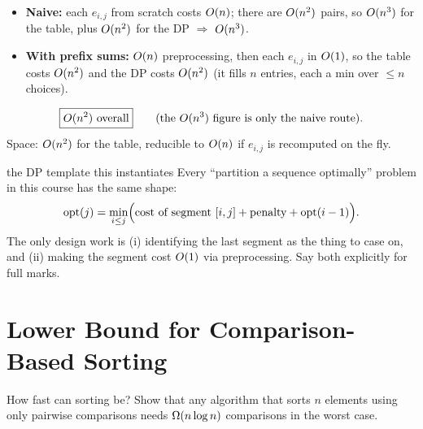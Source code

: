 \begin{cplx}
\begin{itemize}
  \item \textbf{Naive:} each $e_{i,j}$ from scratch costs $O(n)$; there are $O(n^2)$ pairs, so
        $O(n^3)$ for the table, plus $O(n^2)$ for the DP $\Rightarrow$ $O(n^3)$.
  \item \textbf{With prefix sums:} $O(n)$ preprocessing, then each $e_{i,j}$ in $O(1)$, so the
        table costs $O(n^2)$ and the DP costs $O(n^2)$ (it fills $n$ entries, each a min over
        $\le n$ choices).
\end{itemize}
\[
  \boxed{\Oh{n^2}\ \text{overall}}\qquad\text{(the }\Oh{n^3}\text{ figure is only the naive route).}
\]
Space: $O(n^2)$ for the table, reducible to $O(n)$ if $e_{i,j}$ is recomputed on the fly.
\end{cplx}

\begin{facts}{the DP template this instantiates}
Every ``partition a sequence optimally'' problem in this course has the same shape:
\[
  \mathrm{opt}(j)=\min_{i\le j}\Bigl(\text{cost of segment }[i,j]+\text{penalty}+\mathrm{opt}(i-1)\Bigr).
\]
The only design work is (i) identifying the last segment as the thing to case on, and (ii) making
the segment cost $O(1)$ via preprocessing. Say both explicitly for full marks.
\end{facts}

\section{Lower Bound for Comparison-Based Sorting}

\begin{prob}{How fast can sorting be?}
Show that any algorithm that sorts $n$ elements using only pairwise comparisons needs
$\Omega(n\log n)$ comparisons in the worst case.
\end{prob}

